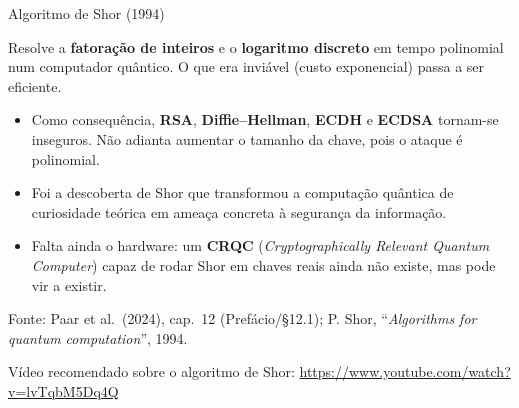 \documentclass{beamer}
\begin{document}
\begin{frame}{Algoritmo de Shor (1994)}
    \begin{tcolorbox}[colback=red!5,colframe=red!60!black,boxrule=0.5pt,title={\footnotesize O que Shor faz}]
        \footnotesize
        Resolve a \textbf{fatoração de inteiros} e o \textbf{logaritmo discreto} em tempo polinomial num computador quântico. O que era inviável (custo exponencial) passa a ser eficiente.
    \end{tcolorbox}
    \medskip
    \begin{itemize}
        \footnotesize
        \item Como consequência, \textbf{RSA}, \textbf{Diffie--Hellman}, \textbf{ECDH} e \textbf{ECDSA} tornam-se inseguros. Não adianta aumentar o tamanho da chave, pois o ataque é polinomial.
        \item Foi a descoberta de Shor que transformou a computação quântica de curiosidade teórica em ameaça concreta à segurança da informação.
        \item Falta ainda o hardware: um \textbf{CRQC} (\textit{Cryptographically Relevant Quantum Computer}) capaz de rodar Shor em chaves reais ainda não existe, mas pode vir a existir.
    \end{itemize}
    \smallskip
    {\tiny Fonte: Paar et al.\ (2024), cap.\ 12 (Prefácio/§12.1); P. Shor, ``\textit{Algorithms for quantum computation}'', 1994.\par}
    \smallskip
    {\tiny Vídeo recomendado sobre o algoritmo de Shor: \url{https://www.youtube.com/watch?v=lvTqbM5Dq4Q}\par}
\end{frame}
\end{document}
